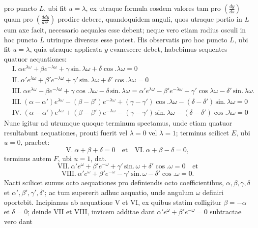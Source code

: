 \documentclass[11pt,a4paper]{article}
\begin{document}
pro puncto $L$, ubi fit $u=\lambda$, ex utraque formula eosdem valores tam
pro $\left(\frac{dy}{ds}\right)$ quam pro $\left(\frac{ddy}{ds^2}\right)$ prodire debere, quandoquidem anguli, quos
utraque portio in $L$ cum axe facit, necessario aequales esse debent; neque
vero etiam radius osculi in hoc puncto $L$ utrinque diversus esse potest.
His observatis pro hoc puncto $L$, ubi fit $u=\lambda$, quia utraque applicata
$y$ evanescere debet, habebimus sequentes quatuor aequationes:
\begin{align*}
&\text{I.}\ \alpha e^{\lambda\omega}+\beta e^{-\lambda\omega}+\gamma\,\text{sin.}\,\lambda\omega+\delta\cos.\lambda\omega=0 \\
&\text{II.}\ \alpha' e^{\lambda\omega}+\beta' e^{-\lambda\omega}+\gamma'\,\text{sin.}\,\lambda\omega+\delta'\cos.\lambda\omega=0 \\
&\text{III.}\ \alpha e^{\lambda\omega}-\beta e^{-\lambda\omega}+\gamma\cos.\lambda\omega-\delta\,\text{sin.}\,\lambda\omega=\alpha' e^{\lambda\omega}-\beta' e^{-\lambda\omega}+\gamma'\cos\lambda\omega-\delta'\,\text{sin.}\,\lambda\omega. \\
&\text{III.}\ (\alpha-\alpha')e^{\lambda\omega}-(\beta-\beta')e^{-\lambda\omega}+(\gamma-\gamma')\cos.\lambda\omega-(\delta-\delta')\,\text{sin.}\,\lambda\omega=0 \\
&\text{IV.}\ (\alpha-\alpha')e^{\lambda\omega}+(\beta-\beta')e^{-\lambda\omega}-(\gamma-\gamma')\,\text{sin.}\,\lambda\omega-(\delta-\delta')\cos.\lambda\omega=0
\end{align*}
Nunc igitur ad utrumque quoque terminum spectamus, unde etiam
quatuor resultabunt aequationes, prouti fuerit vel $\lambda=0$ vel $\lambda=1$;
terminus scilicet $E$, ubi $u=0$, praebet:
\[ \text{V.}\ \alpha+\beta+\delta=0 \quad\text{et}\quad \text{VI.}\ \alpha+\beta-\delta=0, \]
terminus autem $F$, ubi $u=1$, dat.
\[ \text{VII.}\ \alpha' e^{\omega}+\beta' e^{-\omega}+\gamma'\,\text{sin.}\,\omega+\delta'\cos.\omega=0 \quad\text{et} \]
\[ \text{VIII.}\ \alpha' e^{\omega}+\beta' e^{-\omega}-\gamma'\,\text{sin.}\,\omega-\delta'\cos.\omega=0. \]
Nacti scilicet sumus octo aequationes pro definiendis octo coefficientibus,
$\alpha, \beta, \gamma, \delta$ et $\alpha', \beta', \gamma', \delta'$; ac tum supererit adhuc aequatio, unde
angulum $\omega$ definiri oportebit. Incipiamus ab aequatione V et VI,
ex quibus statim colligitur $\beta=-\alpha$ et $\delta=0$; deinde VII et VIII, invicem
additae dant $\alpha' e^{\omega}+\beta' e^{-\omega}=0$ subtractae vero dant
\end{document}
